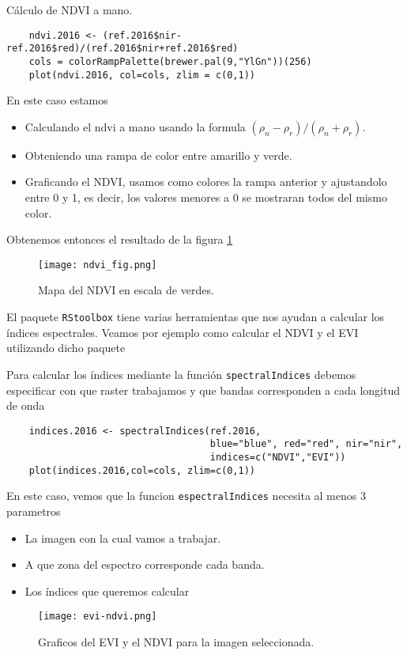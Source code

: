 \begin{exa}
    C\'alculo de NDVI a mano.
    \begin{lstlisting}
    ndvi.2016 <- (ref.2016$nir-ref.2016$red)/(ref.2016$nir+ref.2016$red)
    cols = colorRampPalette(brewer.pal(9,"YlGn"))(256)
    plot(ndvi.2016, col=cols, zlim = c(0,1))
    \end{lstlisting}
    En este caso estamos
    \begin{itemize}
        \item Calculando el ndvi a mano usando la formula $(\rho_n-\rho_r)/(\rho_n+\rho_r)$.
        \item Obteniendo una rampa de color entre amarillo y verde.
        \item Graficando el NDVI, usamos como colores la rampa anterior
            y ajustandolo entre 0 y 1, es decir, los valores menores a 0 se
            mostraran todos del mismo color.
    \end{itemize}
    Obtenemos entonces el resultado de la figura \ref{fig:ndvifig}
    \begin{figure}[h!]
    \begin{center}
        \texttt{[image: ndvi\_fig.png]}
    \end{center}
    \caption{Mapa del NDVI en escala de verdes.}
    \label{fig:ndvifig}
    \end{figure}

\end{exa}

El paquete \texttt{RStoolbox} tiene varias herramientas que nos ayudan a
calcular los \'indices espectrales. Veamos por ejemplo como calcular el NDVI y el
EVI utilizando dicho paquete

\begin{exa}
    Para calcular los \'indices mediante la funci\'on \texttt{spectralIndices} debemos
    especificar con que raster trabajamos y que bandas corresponden a cada
    longitud de onda
    \begin{lstlisting}
    indices.2016 <- spectralIndices(ref.2016,
                                    blue="blue", red="red", nir="nir",
                                    indices=c("NDVI","EVI"))
    plot(indices.2016,col=cols, zlim=c(0,1))
    \end{lstlisting}
    En este caso, vemos que la funcion \texttt{espectralIndices} necesita al
    menos 3 parametros
    \begin{itemize}
        \item La imagen con la cual vamos a trabajar.
        \item A que zona del espectro corresponde cada banda.
        \item Los \'indices que queremos calcular
    \end{itemize}
     \begin{figure}[h!]
     \begin{center}
         \texttt{[image: evi-ndvi.png]}
     \end{center}
     \caption{Graficos del EVI y el NDVI para la imagen seleccionada.}
     \label{fig:evi-ndvi}
     \end{figure}

\end{exa}


